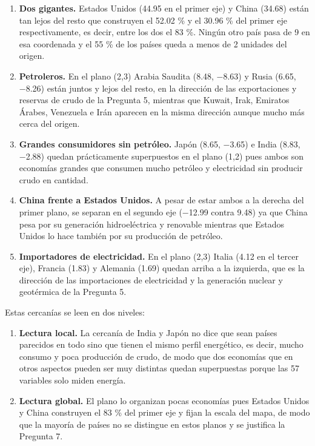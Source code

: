 \documentclass[oneside, openany, fontset=libertinus]{mitthesis}
\providecommand{\tightlist}{\setlength{\itemsep}{0pt}\setlength{\parskip}{0pt}}
\begin{document}
\begin{enumerate}
\def\labelenumi{\alph{enumi}.}
\tightlist
\item
  \textbf{Dos gigantes.} Estados Unidos (44.95 en el primer eje) y China
  (34.68) están tan lejos del resto que construyen el 52.02 \% y el
  30.96 \% del primer eje respectivamente, es decir, entre los dos el 83
  \%. Ningún otro país pasa de 9 en esa coordenada y el 55 \% de los
  países queda a menos de 2 unidades del origen.
\item
  \textbf{Petroleros.} En el plano (2,3) Arabia Saudita (8.48, −8.63) y
  Rusia (6.65, −8.26) están juntos y lejos del resto, en la dirección de
  las exportaciones y reservas de crudo de la Pregunta 5, mientras que
  Kuwait, Irak, Emiratos Árabes, Venezuela e Irán aparecen en la misma
  dirección aunque mucho más cerca del origen.
\item
  \textbf{Grandes consumidores sin petróleo.} Japón (8.65, −3.65) e
  India (8.83, −2.88) quedan prácticamente superpuestos en el plano
  (1,2) pues ambos son economías grandes que consumen mucho petróleo y
  electricidad sin producir crudo en cantidad.
\item
  \textbf{China frente a Estados Unidos.} A pesar de estar ambos a la
  derecha del primer plano, se separan en el segundo eje (−12.99 contra
  9.48) ya que China pesa por su generación hidroeléctrica y renovable
  mientras que Estados Unidos lo hace también por su producción de
  petróleo.
\item
  \textbf{Importadores de electricidad.} En el plano (2,3) Italia (4.12
  en el tercer eje), Francia (1.83) y Alemania (1.69) quedan arriba a la
  izquierda, que es la dirección de las importaciones de electricidad y
  la generación nuclear y geotérmica de la Pregunta 5.
\end{enumerate}

Estas cercanías se leen en dos niveles:

\begin{enumerate}
\def\labelenumi{\alph{enumi}.}
\tightlist
\item
  \textbf{Lectura local.} La cercanía de India y Japón no dice que sean
  países parecidos en todo sino que tienen el mismo perfil energético,
  es decir, mucho consumo y poca producción de crudo, de modo que dos
  economías que en otros aspectos pueden ser muy distintas quedan
  superpuestas porque las 57 variables solo miden energía.
\item
  \textbf{Lectura global.} El plano lo organizan pocas economías pues
  Estados Unidos y China construyen el 83 \% del primer eje y fijan la
  escala del mapa, de modo que la mayoría de países no se distingue en
  estos planos y se justifica la Pregunta 7.
\end{enumerate}
\end{document}
